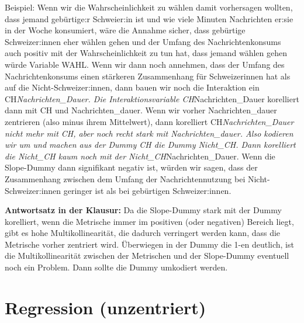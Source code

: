 \documentclass[
  10pt,
  letterpaper,
  a4paper, twoside]{scrreprt}
\begin{document}
\begin{tcolorbox}
Beispiel: Wenn wir die Wahrscheinlichkeit zu wählen damit vorhersagen
wollten, dass jemand gebürtige:r Schweier:in ist und wie viele Minuten
Nachrichten er:sie in der Woche konsumiert, wäre die Annahme sicher,
dass gebürtige Schweizer:innen eher wählen gehen und der Umfang des
Nachrichtenkonsums auch positiv mit der Wahrscheinlichkeit zu tun hat,
dass jemand wählen gehen würde Variable WAHL. Wenn wir dann noch
annehmen, dass der Umfang des Nachrichtenkonsums einen stärkeren
Zusammenhang für Schweizerinnen hat als auf die Nicht-Schweizer:innen,
dann bauen wir noch die Interaktion ein CH\emph{Nachrichten\_Dauer. Die
Interaktionsvariable CH}Nachrichten\_Dauer korelliert dann mit CH und
Nachrichten\_dauer. Wenn wir vorher Nachrichten\_dauer zentrieren (also
minus ihrem Mittelwert), dann korelliert CH\emph{Nachrichten\_Dauer
nicht mehr mit CH, aber noch recht stark mit Nachrichten\_dauer. Also
kodieren wir um und machen aus der Dummy CH die Dummy Nicht\_CH. Dann
korelliert die Nicht\_CH kaum noch mit der Nicht\_CH}Nachrichten\_Dauer.
Wenn die Slope-Dummy dann signifikant negativ ist, würden wir sagen,
dass der Zusammenhang zwischen dem Umfang der Nachrichtennutzung bei
Nicht-Schweizer:innen geringer ist als bei gebürtigen Schweizer:innen.

\textbf{Antwortsatz in der Klausur:} Da die Slope-Dummy stark mit der
Dummy korelliert, wenn die Metrische immer im positiven (oder negativen)
Bereich liegt, gibt es hohe Multikollinearität, die dadurch verringert
werden kann, dass die Metrische vorher zentriert wird. Überwiegen in der
Dummy die 1-en deutlich, ist die Multikollinearität zwischen der
Metrischen und der Slope-Dummy eventuell noch ein Problem. Dann sollte
die Dummy umkodiert werden.

\end{tcolorbox}

\section{Regression (unzentriert)}\label{regression-unzentriert}
\end{document}
